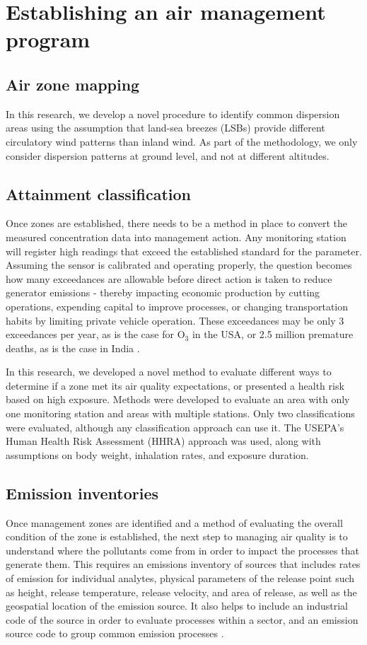 \section{Establishing an air management program}
\subsection{Air zone mapping}

In this research, we develop a novel procedure to identify common dispersion areas using the assumption that land-sea breezes (LSBs) provide different circulatory wind patterns than inland wind. As part of the methodology, we only consider dispersion patterns at ground level, and not at different altitudes.

\subsection{Attainment classification}
Once zones are established, there needs to be a method in place to convert the measured concentration data into management action. Any monitoring station will register high readings that exceed the established standard for the parameter. Assuming the sensor is calibrated and operating properly, the question becomes how many exceedances are allowable before direct action is taken to reduce generator emissions - thereby impacting economic production by cutting operations, expending capital to improve processes, or changing transportation habits by limiting private vehicle operation. These exceedances may be only 3 exceedances per year, as is the case for O$_{3}$ in the USA, or 2.5 million premature deaths, as is the case in India \citep{Landrigan2017}.

In this research, we developed a novel method to evaluate different ways to determine if a zone met its air quality expectations, or presented a health risk based on high exposure. Methods were developed to evaluate an area with only one monitoring station and areas with multiple stations. Only two classifications were evaluated, although any classification approach can use it. The USEPA's Human Health Risk Assessment (HHRA) approach was used, along with assumptions on body weight, inhalation rates, and exposure duration. 

\subsection{Emission inventories}
Once management zones are identified and a method of evaluating the overall condition of the zone is established, the next step to managing air quality is to understand where the pollutants come from in order to impact the processes that generate them. This requires an emissions inventory of sources that includes rates of emission for individual analytes, physical parameters of the release point such as height, release temperature, release velocity, and area of release, as well as the geospatial location of the emission source. It also helps to include an industrial code of the source in order to evaluate processes within a sector, and an emission source code to group common emission processes \citep{The2008}.

